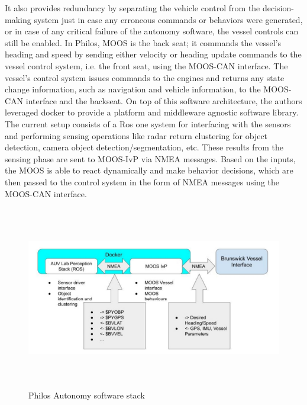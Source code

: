 It also provides redundancy by separating the vehicle control from the decision-making system just in case any erroneous commands or behaviors were generated, or in case of any critical failure of the autonomy software, the vessel controls can still be enabled. In Philos, MOOS is the back seat; it commands the vessel's heading and speed by sending either velocity or heading update commands to the vessel control system, i.e. the front seat, using the MOOS-CAN interface. The vessel's control system issues commands to the engines and returns any state change information, such as navigation and vehicle information, to the MOOS-CAN interface and the backseat. On top of this software architecture, the authors leveraged docker to provide a platform and middleware agnostic software library. The current setup consists of a Ros one system for interfacing with the sensors and performing sensing operations like radar return clustering for object detection, camera object detection/segmentation, etc. These results from the sensing phase are sent to MOOS-IvP via NMEA messages\cite{enwiki:1168017133}. Based on the inputs, the MOOS is able to react dynamically and make behavior decisions, which are then passed to the control system in the form of NMEA messages using the MOOS-CAN interface.\cite{benjamin2009overview}
\begin{figure}[H]
    \centering
    \includegraphics[width=\textwidth,height=8cm,keepaspectratio=true]{src/Images/philos_arch.PNG}
    \caption{
     Philos Autonomy software stack \cite{defilippo2021robowhaler}
     }
\end{figure}
\\

